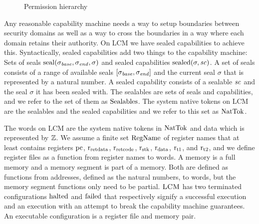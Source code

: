 \documentclass[acmsmall,review,anonymous]{acmart}\settopmatter{printfolios=true,printccs=false,printacmref=false}
\renewcommand{\RegName}{\shareddom{RegName}}
\renewcommand{\SealableCaps}{\shareddom{Sealables}}
\renewcommand{\Cap}{\shareddom{NatTok}}
\newcommand{\trgcm}{\textsc{LCM}}
\begin{document}
\begin{wrapfigure}{r}{0.33\linewidth}
  \centering

  \caption{Permission hierarchy}
  \label{fig:perm-hier}
\end{wrapfigure}

Any reasonable capability machine needs a way to setup boundaries between security domains as well as a way to cross the boundaries in a way where each domain retains their authority.
On \trgcm{} we have sealed capabilities to achieve this.
Syntactically, sealed capabilities add two things to the capability machine: Sets of seals $\mathrm{seal}(\sigma_{\mathit{base}},\sigma_{\mathit{end}},\sigma)$ and sealed capabilities $\mathrm{sealed}(\sigma,\mathit{sc})$.
A set of seals consists of a range of available seals $[\sigma_{\mathit{base}},\sigma_{\mathit{end}}]$ and the current seal $\sigma$ that is represented by a natural number.
A sealed capability consists of a sealable $\mathit{sc}$ and the seal $\sigma$ it has been sealed with.
The sealables are sets of seals and capabilities, and we refer to the set of them as $\SealableCaps$.
The system native tokens on \trgcm{} are the sealables and the sealed capabilities and we refer to this set as $\Cap$.

The words on \trgcm{} are the system native tokens in $\Cap$ and data which is represented by $\mathbb{Z}$.
We assume a finite set $\RegName$ of register names that at least contains registers $\mathrm{pc}$, $\mathrm{r}_\mathrm{ret data}$, $\mathrm{r}_\mathrm{ret code}$, $\mathrm{r}_\mathrm{stk}$, $\mathrm{r}_\mathrm{data}$, $\mathrm{r}_\mathrm{t1}$, and $\mathrm{r}_\mathrm{t2}$, and we define register files as a function from register names to words.
A memory is a full memory and a memory segment is part of a memory.
Both are defined as functions from addresses, defined as the natural numbers, to words, but the memory segment functions only need to be partial.
$\trgcm{}$ has two terminated configurations $\mathrm{halted}$ and $\mathrm{failed}$ that respectively signify a successful execution and an execution with an attempt to break the capability machine guarantees.
An executable configuration is a register file and memory pair. 
\end{document}
